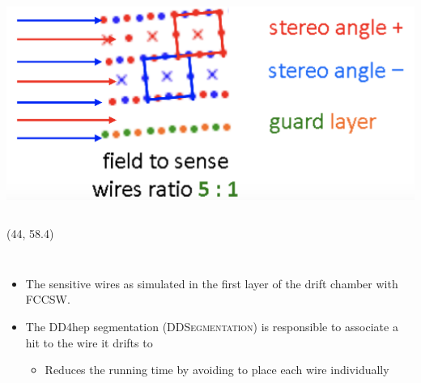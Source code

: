 \documentclass[final,xcolor={dvipsnames,svgnames,x11names,table}]{beamer}
\begin{document}
\begin{frame}
\begin{textblock}{43}
\begin{tcolorbox}[title=The IDEA drift chamber]
\begin{columns}
      \centering
      \includegraphics[width=\textwidth]{Figures/Field_sensWires.png}

    \end{columns}

  \vspace{0.5cm}

  \end{tcolorbox}
\end{textblock}


\begin{textblock}{39.5}(44, 58.4)
  \begin{tcolorbox}[title=The simulation of the drift chamber with FCCSW]

    \begin{columns}
      \begin{itemize}
        \item The sensitive wires as simulated in the first layer of the drift chamber with FCCSW. \vspace{0.5cm}
        \item The DD4hep segmentation (\textsc{DDSegmentation}) is responsible to associate a hit to the wire it drifts to \vspace{0.5cm}
          \begin{itemize}
            \item Reduces the running time by avoiding to place each wire individually
          \end{itemize}
      \end{itemize}


\end{columns}
\end{tcolorbox}
\end{textblock}
\end{frame}
\end{document}
